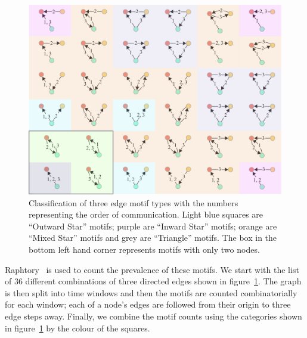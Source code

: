 \documentclass[twocolumn,10pt]{article}
\newlength{\figureWidthOneColumn}
\begin{document}
\begin{figure}
  \centering
  \includegraphics[width=\figureWidthOneColumn]{figures-prev/icwsm-2024/motifs.pdf}
  \caption{
    Classification of three edge motif types with the numbers representing
    the order of communication.  Light blue squares are  ``Outward Star''
    motifs; purple are ``Inward Star'' motifs; orange are ``Mixed Star''
    motifs and grey are ``Triangle'' motifs. The box in the bottom left hand
    corner represents motifs with only two nodes.
  }
  \label{fig:motif_types}
\end{figure}

Raphtory~\cite{steer2020raphtory} is used to count the prevalence of these
motifs. We start with the list of 36 different combinations of three
directed edges shown in figure~\ref{fig:motif_types}. The graph is then
split into time windows and then the motifs are counted combinatorially for
each window; each of a node's edges are followed from their origin to three
edge steps away. Finally, we combine the motif counts using the categories
shown in figure~\ref{fig:motif_types} by the colour of the squares.


\end{document}
